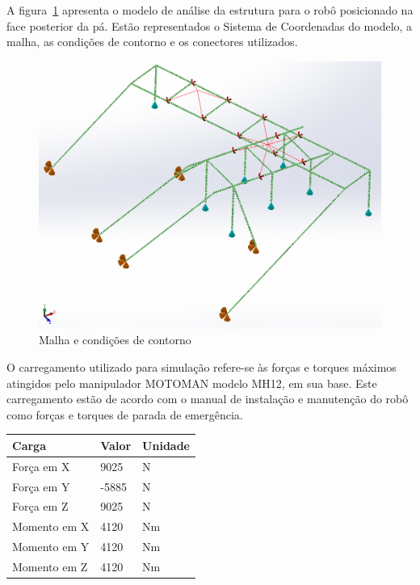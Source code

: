 A figura~\ref{fig::contorno} apresenta o modelo de análise da estrutura para o
robô posicionado na face posterior da pá. Estão representados o Sistema de
Coordenadas do modelo, a malha, as condições de contorno e os conectores
utilizados.

\begin{figure}[H]
	\centering
	\includegraphics[width=0.9\columnwidth]{figs/dimensionamento/contorno}
	\caption{Malha e condições de contorno}
    \label{fig::contorno}
\end{figure}

 O carregamento utilizado para simulação
refere-se às forças e torques máximos atingidos pelo manipulador MOTOMAN modelo MH12, em
sua base. Este carregamento estão de acordo com o manual de instalação e
manutenção do robô como forças e torques de parada de emergência.  

\begin{center}
\centering
\begin{tabular}{|l|l|l|}
\hline
\textbf{Carga}		   & \textbf{Valor} & \textbf{Unidade}   \\ \hline
Força em X		       & 9025           & N	                 \\ \hline
Força em Y			   & -5885          & N                  \\ \hline
Força em Z			   & 9025           & N                  \\ \hline
Momento em X		   & 4120           & Nm                 \\ \hline
Momento em Y		   & 4120           & Nm                 \\ \hline
Momento em Z		   & 4120           & Nm                 \\ \hline
\end{tabular}
\label{tab::carregamento}
\end{center}

